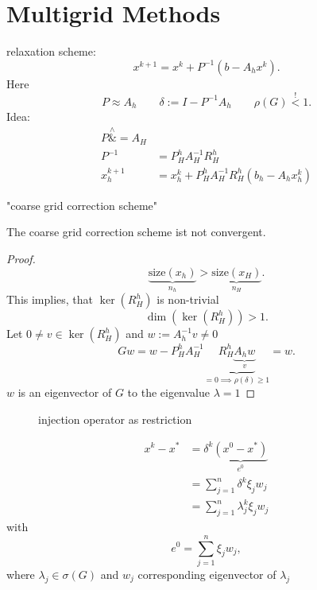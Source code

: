 \chapter{Multigrid Methods}%
\label{cha:Multigrid Methods}

relaxation scheme:
\[
	x^{k+1} = x^{k} + P^{-1}(b-A_{h}x^{k})
.\] 
Here
\[
	P\approx A_{h} \qquad \delta := I-P^{-1}A_{h} \qquad \rho (G) \overset{!}{<} 1 
.\] 
Idea:
\begin{align*}
	P \overset{\wedge}&{=} A_{H} \\
	{P}^{-1} &= P_{H}^{h} {A}^{-1}_{H}R_{H}^{h} \\
	x_{h}^{k+1}&= x_{h}^{k} + P_{H}^{h}A_{H}^{-1}R_{H}^{h}(b_{h} - A_{h}x_{h}^{k})
\end{align*}

"coarse grid correction scheme"

\begin{lemma}
	The coarse grid correction scheme ist not convergent.
\end{lemma}

\begin{proof}
	\[
		\underbrace{\text{size}(x_{h})}_{n_{h}}> \underbrace{\text{size}(x_{H})}_{n_{H}}  
	.\] 
	This implies, that $\ker(R_{H}^{h})$ is non-trivial
	\[
		\dim(\ker(R_{H}^{h})) > 1
	.\] 
	Let $0 \neq v \in \ker(R_{H}^{h})$ and $w:={A}^{-1}_{h}v \neq 0$
	\[
		Gw = w-P_{H}^{h} {A}^{-1}_{H}\underbrace{R_{H}^{h}\underbrace{A_{h}w}_{v} }_{=0 \implies \rho (\delta ) \geq  1} = w
	.\]
	$w$ is an eigenvector of $G$ to the eigenvalue $\lambda =1$
\end{proof}

\begin{figure}[H]
	\begin{center}
		
	\end{center}
	\caption{injection operator as restriction}
\end{figure}

\begin{align*}
	x^{k}- {x}^{*} &= \delta^{k}\underbrace{(x^{0}- {x}^{*})}_{e^{0}} \\
				   &=\sum_{j=1}^{n}{\delta ^{k}\xi _{j}w_{j}} \\
				   &= \sum_{j=1}^{n}{\lambda ^{k}_{j}\xi _{j}w_{j}}
\end{align*}
with
\[
e^{0} = \sum_{j=1}^{n}{\xi _{j}w_{j}}
,\] 
where $\lambda _{j} \in \sigma (G)$ and $w_{j}$ corresponding eigenvector of $\lambda _{j}$

